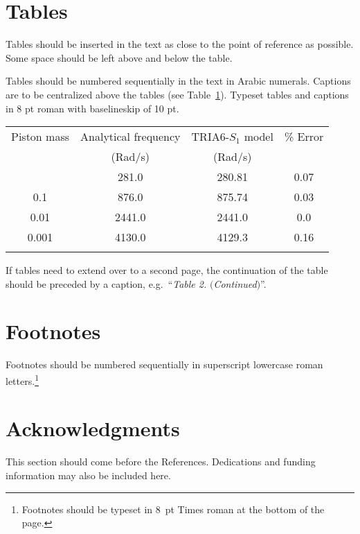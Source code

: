 \documentclass{ws-ijmpd}
\begin{document}
\section{Tables}

Tables should be inserted in the text as close to the point of
reference as possible. Some space should be left above and below
the table.

Tables should be numbered sequentially in the text in Arabic
numerals. Captions are to be centralized above the tables (see
Table~\ref{ta1}).  Typeset tables and captions in 8 pt roman with
baselineskip of 10 pt.

\begin{table}[ph]
{\begin{tabular}{@{}cccc@{}} \toprule
Piston mass & Analytical frequency & TRIA6-$S_1$ model &
\% Error \\
& (Rad/s) & (Rad/s) \\ \colrule
1.0\hphantom{00} & \hphantom{0}281.0 & \hphantom{0}280.81 & 0.07 \\
0.1\hphantom{00} & \hphantom{0}876.0 & \hphantom{0}875.74 & 0.03 \\
0.01\hphantom{0} & 2441.0 & 2441.0\hphantom{0} & 0.0\hphantom{0} \\
0.001 & 4130.0 & 4129.3\hphantom{0} & 0.16\\ \botrule
\end{tabular} \label{ta1}}
\end{table}

If tables need to extend over to a second page, the continuation of
the table should be preceded by a caption, e.g.~``{\it Table 2.}
$(${\it Continued}$)$''.

\section{Footnotes}

Footnotes should be numbered sequentially in superscript lowercase
roman letters.\footnote{Footnotes should be typeset in 8~pt Times
roman at the bottom of the page.}

\section*{Acknowledgments}

This section should come before the References. Dedications and funding
information may also be included
here.
\end{document}
